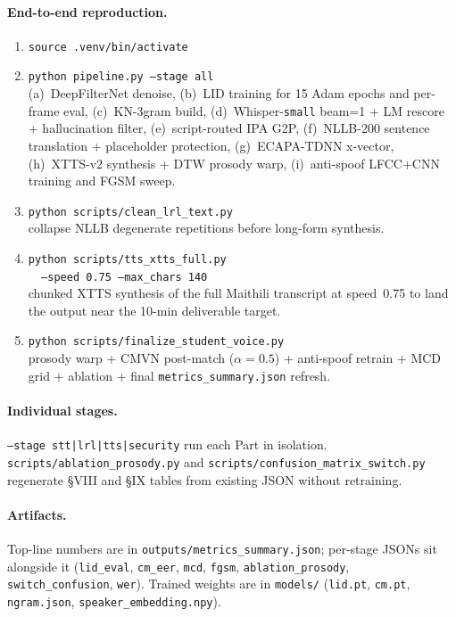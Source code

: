 \documentclass[conference]{IEEEtran}
\begin{document}
\paragraph*{End-to-end reproduction.}
\begin{enumerate}\itemsep=2pt
    \item \texttt{source .venv/bin/activate}
    \item \texttt{python pipeline.py --stage all}\\
        (a)~DeepFilterNet denoise, (b)~LID training for 15 Adam epochs
        and per-frame eval, (c)~KN-3gram build, (d)~Whisper-\texttt{small}
        beam=1 + LM rescore + hallucination filter, (e)~script-routed IPA
        G2P, (f)~NLLB-200 sentence translation + placeholder protection,
        (g)~ECAPA-TDNN x-vector, (h)~XTTS-v2 synthesis + DTW prosody warp,
        (i)~anti-spoof LFCC+CNN training and FGSM sweep.
    \item \texttt{python scripts/clean\_lrl\_text.py}\\
        collapse NLLB degenerate repetitions before long-form synthesis.
    \item \texttt{python scripts/tts\_xtts\_full.py}\\
        \texttt{\ \ --speed 0.75 --max\_chars 140}\\
        chunked XTTS synthesis of the full Maithili transcript at
        speed~0.75 to land the output near the 10-min deliverable target.
    \item \texttt{python scripts/finalize\_student\_voice.py}\\
        prosody warp + CMVN post-match ($\alpha{=}0.5$) + anti-spoof
        retrain + MCD grid + ablation + final
        \texttt{metrics\_summary.json} refresh.
\end{enumerate}

\paragraph*{Individual stages.} \texttt{--stage stt|lrl|tts|security}
run each Part in isolation. \texttt{scripts/ablation\_prosody.py} and
\texttt{scripts/confusion\_matrix\_switch.py} regenerate \S VIII and
\S IX tables from existing JSON without retraining.

\paragraph*{Artifacts.} Top-line numbers are in
\texttt{outputs/metrics\_summary.json}; per-stage JSONs sit alongside it
(\texttt{lid\_eval}, \texttt{cm\_eer}, \texttt{mcd}, \texttt{fgsm},
\texttt{ablation\_prosody}, \texttt{switch\_confusion}, \texttt{wer}).
Trained weights are in \texttt{models/} (\texttt{lid.pt},
\texttt{cm.pt}, \texttt{ngram.json}, \texttt{speaker\_embedding.npy}).
\end{document}
